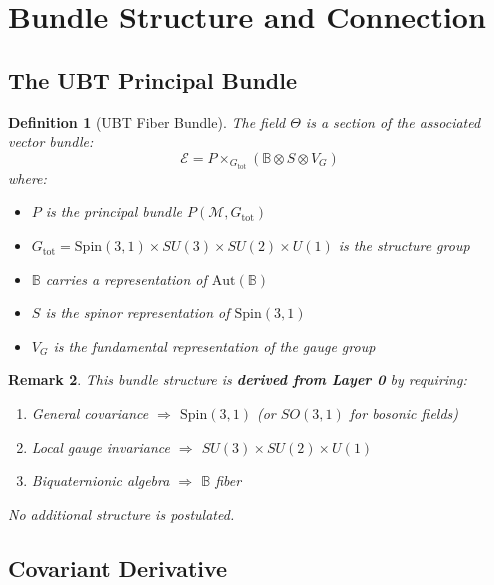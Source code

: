 \documentclass[12pt]{article}
\newtheorem{definition}{Definition}[section]
\newtheorem{remark}[definition]{Remark}
\newcommand{\B}{\mathbb{B}}
\newcommand{\M}{\mathcal{M}}
\begin{document}
\section{Bundle Structure and Connection}

\subsection{The UBT Principal Bundle}

\begin{definition}[UBT Fiber Bundle]
The field $\Theta$ is a section of the associated vector bundle:
\begin{equation}
\mathcal{E} = P \times_{G_{\text{tot}}} (\B \otimes S \otimes V_G)
\end{equation}
where:
\begin{itemize}
    \item $P$ is the principal bundle $P(\M, G_{\text{tot}})$
    \item $G_{\text{tot}} = \mathrm{Spin}(3,1) \times SU(3) \times SU(2) \times U(1)$ is the structure group
    \item $\B$ carries a representation of $\mathrm{Aut}(\B)$
    \item $S$ is the spinor representation of $\mathrm{Spin}(3,1)$
    \item $V_G$ is the fundamental representation of the gauge group
\end{itemize}
\end{definition}

\begin{remark}
This bundle structure is \textbf{derived from Layer 0} by requiring:
\begin{enumerate}
    \item General covariance $\Rightarrow$ $\mathrm{Spin}(3,1)$ (or $SO(3,1)$ for bosonic fields)
    \item Local gauge invariance $\Rightarrow$ $SU(3) \times SU(2) \times U(1)$
    \item Biquaternionic algebra $\Rightarrow$ $\B$ fiber
\end{enumerate}
No additional structure is postulated.
\end{remark}

\subsection{Covariant Derivative}
\end{document}

